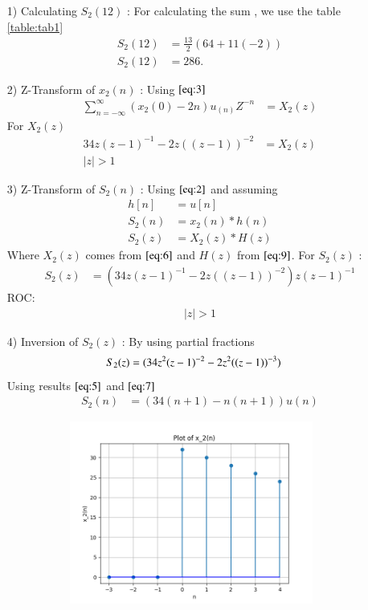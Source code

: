 \documentclass[journal,12pt,twocolumn]{IEEEtran}
\theoremstyle{remark}
\begin{document}
\begin{enumerate}
\item[1)] 
Calculating $S_2(12)$ :
For calculating the sum , we use the table \ref{table:tab1}
\begin{align}
 S_2{(12)} &= \frac{13}{2}(64+11(-2))\\
 S_2{(12)} &= 286.
 \end{align}

    \vspace{0.7cm}
\item[2)] 
Z-Transform of $x_2(n)$ :
Using $\eqref{eq:3}$
\vspace{0.05cm}
\begin{align}
\sum_{n=-\infty}^{\infty}(x_2(0) -2n)u_{(n)}Z^{-n} &= X_2(z)
\end{align}
For $X_2(z)$ 
\begin{align}
  34z(z-1)^{-1}-
       2z((z-1))^{-2} &= X_2(z) \label{eq:6}\\
    \lvert z\rvert  >  1 
\end{align}

\item[3)]
Z-Transform of $S_2(n)$ :
Using $\eqref{eq:2}$ and assuming 
\begin{align}
         h[n] &= u[n] \\
    S_2(n) &= x_2(n) * h(n) \\
    S_2(z) &= X_2(z) * H(z)
    \end{align}
    Where $X_2(z)$ comes from $\eqref{eq:6}$ and $H(z)$ from $\eqref{eq:9}$.
    \vspace{0.05cm}
    For $S_2(z)$ :
    \begin{align}
            S_2(z) &= (34z(z-1)^{-1}-
       2z((z-1))^{-2})z(z-1)^{-1}
    \end{align}
    ROC:
    \begin{align} 
    \lvert z \rvert > 1
    \end{align}
    
    \item[4)]
Inversion of $S_2(z)$ :
By using partial fractions 
\begin{align}
    S_2(z) &= \notag(34z^2(z-1)^{-2} - 2z^2((z-1))^{-3}) 
\end{align}
Using results $\eqref{eq:5}$ and $\eqref{eq:7}$
\begin{align}
 S_2(n) &= (34(n+1) - n(n+1))u(n)   
\end{align}

\begin{figure}[!ht]
\centering
  \graphicspath{ {figs/} }
\includegraphics[width=10cm, height=6cm]{graph_2}
\captionsetup{Graph:2 $x_2(n)$ vs n }
\label{graph:3}
\end{figure}


\end{enumerate}
\end{document}
